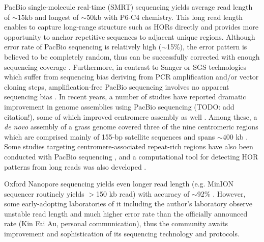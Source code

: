   PacBio single-molecule real-time (SMRT) sequencing yields average read length of $\sim$15kb and longest of $\sim$50kb with P6-C4 chemistry. This long read length enables to capture long-range structure such as HORs directly and provides more opportunity to anchor repetitive sequences to adjacent unique regions. Although error rate of PacBio sequencing is relatively high ($\sim$15\%), the error pattern is believed to be completely random, thus can be successfully corrected with enough sequencing coverage \cite{Myers2014}. Furthermore, in contrast to Sanger or SGS technologies which suffer from sequencing bias deriving from PCR amplification and/or vector cloning steps, amplification-free PacBio sequencing involves no apparent sequencing bias \cite{Ross2013}. In recent years, a number of studies have reported dramatic improvement in genome assemblies using PacBio sequencing (TODO: add citation!), some of which improved centromere assembly as well \cite{VanBuren2015, Vij2016, Jiao2016}. Among these, a \textit{de novo} assembly of a grass genome covered three of the nine centromeric regions which are comprised mainly of 155-bp satellite sequences and spans $\sim$400 kb \cite{VanBuren2015}. Some studies targeting centromere-associated repeat-rich regions have also been conducted with PacBio sequencing \cite{Wolfgruber2016, Khost2016}, and a computational tool for detecting HOR patterns from long reads was also developed \cite{Sevim2016}.

  Oxford Nanopore sequencing yields even longer read length (e.g. MinION sequencer routinely yields $>$150 kb read) with accuracy of $\sim$92\% \cite{Jain2016}. However, some early-adopting laboratories of it including the author's laboratory observe unstable read length and much higher error rate than the officially announced rate (Kin Fai Au, personal communication), thus the community awaits improvement and sophistication of its sequencing technology and protocols.


